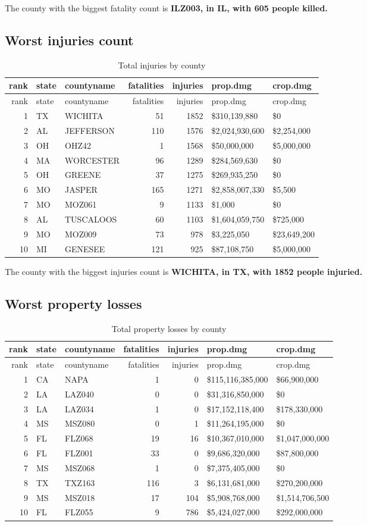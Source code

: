 \documentclass[]{article}
\begin{document}
The county with the biggest fatality count is \textbf{ILZ003, in IL,
with 605 people killed.}

\subsection{Worst injuries count}\label{worst-injuries-count}

\begin{longtable}[]{@{}rllrrll@{}}
\caption{Total injuries by county}\tabularnewline
\toprule
rank & state & countyname & fatalities & injuries & prop.dmg &
crop.dmg\tabularnewline
\midrule
\endfirsthead
\toprule
rank & state & countyname & fatalities & injuries & prop.dmg &
crop.dmg\tabularnewline
\midrule
\endhead
1 & TX & WICHITA & 51 & 1852 & \$310,139,880 & \$0\tabularnewline
2 & AL & JEFFERSON & 110 & 1576 & \$2,024,930,600 &
\$2,254,000\tabularnewline
3 & OH & OHZ42 & 1 & 1568 & \$50,000,000 & \$5,000,000\tabularnewline
4 & MA & WORCESTER & 96 & 1289 & \$284,569,630 & \$0\tabularnewline
5 & OH & GREENE & 37 & 1275 & \$269,935,250 & \$0\tabularnewline
6 & MO & JASPER & 165 & 1271 & \$2,858,007,330 & \$5,500\tabularnewline
7 & MO & MOZ061 & 9 & 1133 & \$1,000 & \$0\tabularnewline
8 & AL & TUSCALOOS & 60 & 1103 & \$1,604,059,750 &
\$725,000\tabularnewline
9 & MO & MOZ009 & 73 & 978 & \$3,225,050 & \$23,649,200\tabularnewline
10 & MI & GENESEE & 121 & 925 & \$87,108,750 &
\$5,000,000\tabularnewline
\bottomrule
\end{longtable}

The county with the biggest injuries count is \textbf{WICHITA, in TX,
with 1852 people injuried.}

\subsection{Worst property losses}\label{worst-property-losses}

\begin{longtable}[]{@{}rllrrll@{}}
\caption{Total property losses by county}\tabularnewline
\toprule
rank & state & countyname & fatalities & injuries & prop.dmg &
crop.dmg\tabularnewline
\midrule
\endfirsthead
\toprule
rank & state & countyname & fatalities & injuries & prop.dmg &
crop.dmg\tabularnewline
\midrule
\endhead
1 & CA & NAPA & 1 & 0 & \$115,116,385,000 & \$66,900,000\tabularnewline
2 & LA & LAZ040 & 0 & 0 & \$31,316,850,000 & \$0\tabularnewline
3 & LA & LAZ034 & 1 & 0 & \$17,152,118,400 &
\$178,330,000\tabularnewline
4 & MS & MSZ080 & 0 & 1 & \$11,264,195,000 & \$0\tabularnewline
5 & FL & FLZ068 & 19 & 16 & \$10,367,010,000 &
\$1,047,000,000\tabularnewline
6 & FL & FLZ001 & 33 & 0 & \$9,686,320,000 & \$87,800,000\tabularnewline
7 & MS & MSZ068 & 1 & 0 & \$7,375,405,000 & \$0\tabularnewline
8 & TX & TXZ163 & 116 & 3 & \$6,131,681,000 &
\$270,200,000\tabularnewline
9 & MS & MSZ018 & 17 & 104 & \$5,908,768,000 &
\$1,514,706,500\tabularnewline
10 & FL & FLZ055 & 9 & 786 & \$5,424,027,000 &
\$292,000,000\tabularnewline
\bottomrule
\end{longtable}
\end{document}

